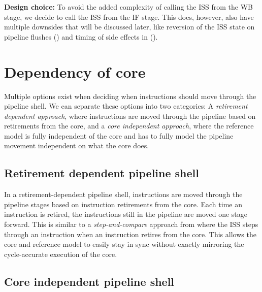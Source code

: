 \textbf{Design choice:} To avoid the added complexity of calling the ISS from the WB stage, we decide to call the ISS from the IF stage. This does, however, also have multiple downsides that will be discussed later, like reversion of the ISS state on pipeline flushes () and timing of side effects in ().
%
%
%


\section{Dependency of core}
\label{sec:ps_dependency}

Multiple options exist when deciding when instructions should move through the pipeline shell. We can separate these options into two categories: A \textit{retirement dependent approach}, where instructions are moved through the pipeline based on retirements from the core, and a \textit{core independent approach}, where the reference model is fully independent of the core and has to fully model the pipeline movement independent on what the core does. 

\subsection{Retirement dependent pipeline shell}

In a retirement-dependent pipeline shell, instructions are moved through the pipeline stages based on instruction retirements from the core. Each time an instruction is retired, the instructions still in the pipeline are moved one stage forward. This is similar to a \textit{step-and-compare} approach from  where the ISS steps through an instruction when an instruction retires from the core. This allows the core and reference model to easily stay in sync without exactly mirroring the cycle-accurate execution of the core.


\subsection{Core independent pipeline shell}


